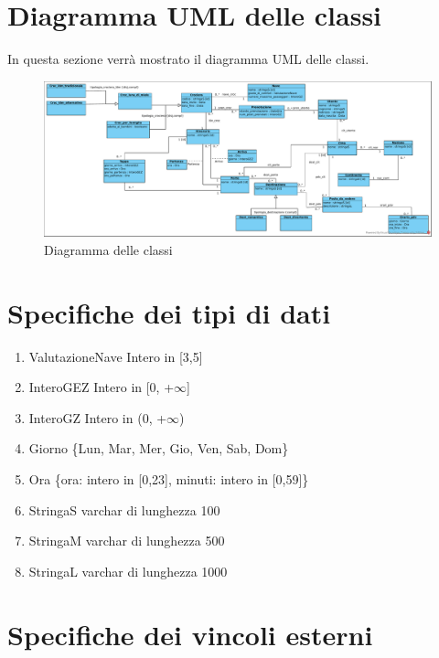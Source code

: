 \documentclass{article}
\begin{document}
\newpage
\section{Diagramma UML delle classi}

In questa sezione verrà mostrato il diagramma UML delle classi.
\begin{figure}[h]
    \centering
    \includegraphics[width=\textwidth]{../Diagramma delle classi.pdf}
    \caption{Diagramma delle classi}
\end{figure}

\newpage
\section{Specifiche dei tipi di dati}

\begin{enumerate}
    \item ValutazioneNave Intero in [3,5]
    \item InteroGEZ Intero in [0, +$\infty$]
    \item InteroGZ Intero in (0, +$\infty$)
    \item Giorno \{Lun, Mar, Mer, Gio, Ven, Sab, Dom\}
    \item Ora \{ora: intero in [0,23], minuti: intero in [0,59]\}
    \item StringaS varchar di lunghezza 100
    \item StringaM varchar di lunghezza 500
    \item StringaL varchar di lunghezza 1000
\end{enumerate}


\newpage
\section{Specifiche dei vincoli esterni}
\end{document}
